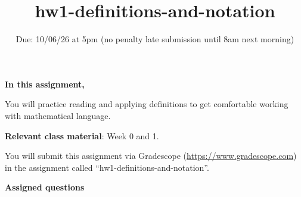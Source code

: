 

\title{hw1-definitions-and-notation}
\date{Due: 10/06/26 at 5pm (no penalty late submission until 8am next morning)}

\maketitle
\thispagestyle{fancy}


{\bf In this assignment,}

You will practice reading and
applying definitions to get comfortable working with mathematical language.

{\bf Relevant class material}: Week 0 and 1.

You will submit this assignment via Gradescope
(\href{https://www.gradescope.com}{https://www.gradescope.com}) 
in the assignment called ``hw1-definitions-and-notation''.

\instructions


{\bf Assigned questions}

